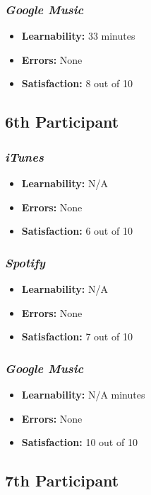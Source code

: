 \documentclass{article}
\begin{document}
{\begin{multicols}{2}
\subsubsection{\it Google Music}
\begin{itemize}
\item {\bf Learnability:} 33 minutes
	\item {\bf Errors:} None
	\item {\bf Satisfaction:} 8 out of 10 
\end{itemize}

\subsection{6th Participant}

\subsubsection{\it iTunes}
\begin{itemize}
	\item {\bf Learnability:} N/A
	\item {\bf Errors:}  None
	\item {\bf Satisfaction:} 6 out of 10 
\end{itemize}

\subsubsection{\it Spotify}
\begin{itemize}
	\item {\bf Learnability:} N/A
	\item {\bf Errors:} None
	\item {\bf Satisfaction:} 7 out of 10 
\end{itemize}

\subsubsection{\it Google Music}
\begin{itemize}
\item {\bf Learnability:} N/A minutes
	\item {\bf Errors:} None
	\item {\bf Satisfaction:} 10 out of 10 
\end{itemize}

\subsection{7th Participant}


\end{multicols}}
\end{document}
